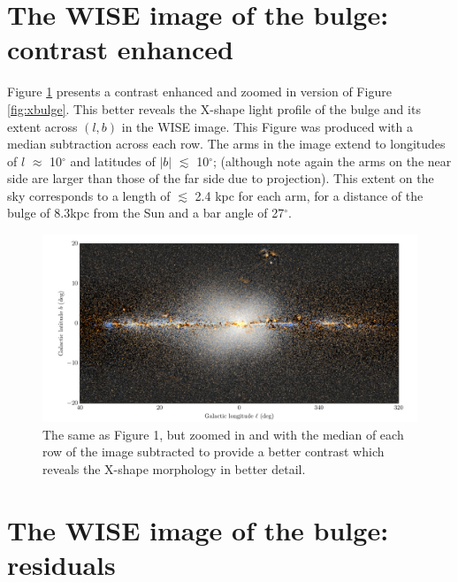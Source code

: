 \documentclass[12pt, preprint]{aastex}
\begin{document}
\section{The WISE image of the bulge: contrast enhanced}

Figure \ref{fig:filt} presents a contrast enhanced and zoomed in version of Figure \ref{fig:xbulge}. This better reveals the X-shape light profile of the bulge and its extent across $(l,b)$ in the WISE image. This Figure was produced with a median subtraction across each row. The arms in the image extend to longitudes of $l$ $\approx$ 10$^\circ$ and latitudes of $|b|$ $\lesssim$ 10$^\circ$; (although note again the arms on the near side are larger than those of the far side due to projection). This extent on the sky corresponds to a length of $\lesssim$ 2.4 kpc for each arm, for a distance of the bulge of 8.3kpc from the Sun and a bar angle of 27$^\circ$. 

\begin{figure}[h!]
\centering
        \includegraphics[width=\textwidth]{xbulge-01}
\caption{The same as Figure 1, but zoomed in and with the median of each row of the image subtracted to provide a better contrast which reveals the X-shape morphology in better detail.}
\label{fig:filt}
\end{figure}

\section{The WISE image of the bulge: residuals}
\end{document}
